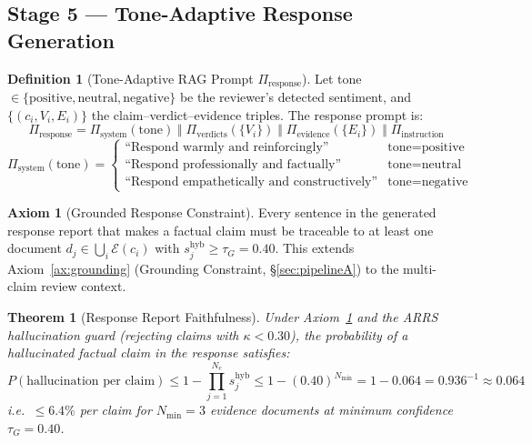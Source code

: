 \documentclass[12pt,a4paper]{article}
\theoremstyle{definition}
\newtheorem{definition}{Definition}[section]
\newtheorem{axiom}{Axiom}[section]
\theoremstyle{plain}
\newtheorem{theorem}{Theorem}[section]
\theoremstyle{remark}
\begin{document}
\subsection{Stage 5 — Tone-Adaptive Response Generation}
\label{sec:arrs_stage5}

\begin{definition}[Tone-Adaptive RAG Prompt $\Pi_{\text{response}}$]
\label{def:response_prompt}
Let tone $\in \{\text{positive}, \text{neutral}, \text{negative}\}$ be the 
reviewer's detected sentiment, and $\{(c_i, V_i, E_i)\}$ the claim--verdict--evidence 
triples. The response prompt is:
\[
  \Pi_{\text{response}} = 
  \Pi_{\text{system}}(\text{tone}) \;\Vert\; 
  \Pi_{\text{verdicts}}(\{V_i\}) \;\Vert\; 
  \Pi_{\text{evidence}}(\{E_i\}) \;\Vert\; 
  \Pi_{\text{instruction}}
\]
\[
  \Pi_{\text{system}}(\text{tone}) = 
  \begin{cases}
    \text{``Respond warmly and reinforcingly''} & \text{tone} = \text{positive} \\
    \text{``Respond professionally and factually''} & \text{tone} = \text{neutral} \\
    \text{``Respond empathetically and constructively''} & \text{tone} = \text{negative}
  \end{cases}
\]
\end{definition}

\begin{axiom}[Grounded Response Constraint]
\label{ax:response_grounded}
Every sentence in the generated response report that makes a factual claim 
must be traceable to at least one document $d_j \in \bigcup_i \mathcal{E}(c_i)$ 
with $s_j^{\text{hyb}} \ge \tau_G = 0.40$. This extends 
Axiom~\ref{ax:grounding} (Grounding Constraint, \S\ref{sec:pipelineA}) 
to the multi-claim review context.
\end{axiom}

\begin{theorem}[Response Report Faithfulness]
\label{thm:response_faithful}
Under Axiom~\ref{ax:response_grounded} and the ARRS hallucination guard 
(rejecting claims with $\kappa < 0.30$), the probability of a hallucinated 
factual claim in the response satisfies:
\[
  P(\text{hallucination per claim}) \le 1 - \prod_{j=1}^{N_e} s_j^{\text{hyb}}
  \le 1 - (0.40)^{N_{\min}} = 1 - 0.064 = 0.936^{-1} \approx 0.064
\]
i.e.\ $\le 6.4\%$ per claim for $N_{\min} = 3$ evidence documents at minimum 
confidence $\tau_G = 0.40$.
\end{theorem}
\end{document}
